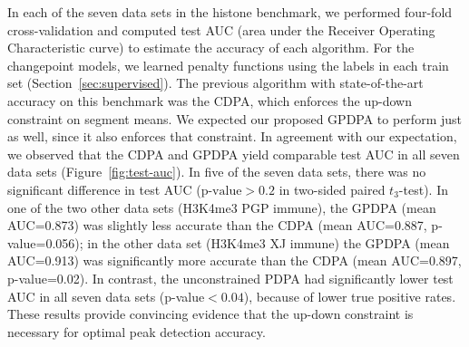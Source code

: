 \documentclass[twoside,11pt]{article}
\begin{document}
In each of the seven data sets in the histone benchmark,
we performed four-fold cross-validation and computed test AUC (area
under the Receiver Operating Characteristic curve) to estimate the
accuracy of each algorithm. For the changepoint models, we learned
penalty functions using the labels in each train set
(Section~\ref{sec:supervised}). The previous algorithm with
state-of-the-art accuracy on this benchmark was the CDPA, which
enforces the up-down constraint on segment means. We expected our
proposed GPDPA to perform just as well, since it also enforces that
constraint. In agreement with our expectation, we observed that the
CDPA and GPDPA yield comparable test AUC in all seven data sets
(Figure~\ref{fig:test-auc}).
In five of the seven data sets,
there was no significant difference in test AUC ($\text{p-value}>0.2$ in
two-sided paired $t_3$-test). In one of the two other data sets
(H3K4me3 PGP immune), the GPDPA (mean AUC=0.873) was slightly less
accurate than the CDPA (mean AUC=0.887, p-value=0.056); in the other
data set (H3K4me3 XJ immune) the GPDPA (mean AUC=0.913) was significantly
more accurate than the CDPA (mean AUC=0.897, p-value=0.02). In contrast, the
unconstrained PDPA had significantly lower test AUC in all seven data sets
(p-value$<0.04$), because of lower true positive rates. These results
provide convincing evidence that the up-down constraint is necessary for
optimal peak detection accuracy.
\end{document}
